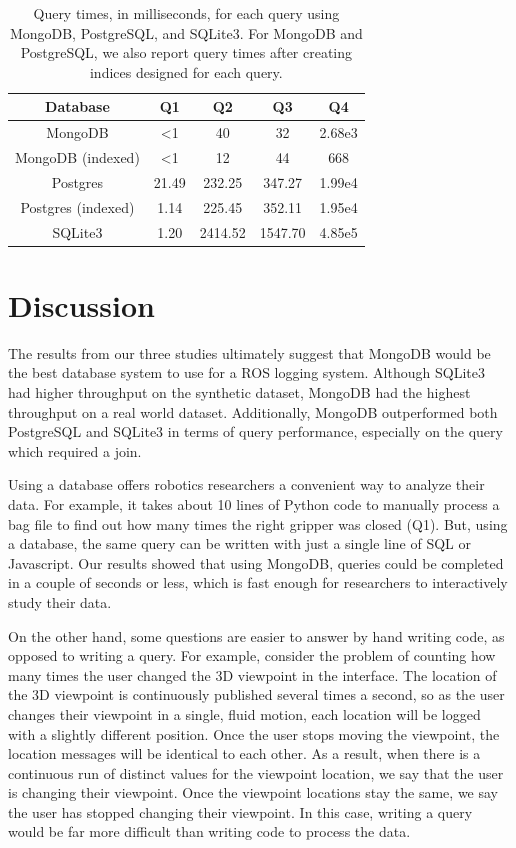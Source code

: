 \documentclass[nocopyrightspace]{acm_proc_article-sp}
\begin{document}
\begin{table}
    \centering
    \begin{tabular}{c | c | c | c | c}
        Database           & Q1     & Q2      & Q3      & Q4     \\
        \hline
        MongoDB            & <1     & 40      & 32      & 2.68e3 \\
        MongoDB (indexed)  & <1     & 12      & 44      & 668    \\
        Postgres           & 21.49  & 232.25  & 347.27  & 1.99e4 \\
        Postgres (indexed) & 1.14   & 225.45  & 352.11  & 1.95e4 \\
        SQLite3            & 1.20   & 2414.52 & 1547.70 & 4.85e5 
    \end{tabular}
    \caption{Query times, in milliseconds, for each query using MongoDB, PostgreSQL, and SQLite3. For MongoDB and PostgreSQL, we also report query times after creating indices designed for each query.}
    \label{tab:queries}
\end{table}

\section{Discussion}
The results from our three studies ultimately suggest that MongoDB would be the best database system to use for a ROS logging system. Although SQLite3 had higher throughput on the synthetic dataset, MongoDB had the highest throughput on a real world dataset. Additionally, MongoDB outperformed both PostgreSQL and SQLite3 in terms of query performance, especially on the query which required a join.

Using a database offers robotics researchers a convenient way to analyze their data. For example, it takes about 10 lines of Python code to manually process a bag file to find out how many times the right gripper was closed (Q1). But, using a database, the same query can be written with just a single line of SQL or Javascript. Our results showed that using MongoDB, queries could be completed in a couple of seconds or less, which is fast enough for researchers to interactively study their data.

On the other hand, some questions are easier to answer by hand writing code, as opposed to writing a query. For example, consider the problem of counting how many times the user changed the 3D viewpoint in the interface. The location of the 3D viewpoint is continuously published several times a second, so as the user changes their viewpoint in a single, fluid motion, each location will be logged with a slightly different position. Once the user stops moving the viewpoint, the location messages will be identical to each other. As a result, when there is a continuous run of distinct values for the viewpoint location, we say that the user is changing their viewpoint. Once the viewpoint locations stay the same, we say the user has stopped changing their viewpoint. In this case, writing a query would be far more difficult than writing code to process the data. 
\end{document}
